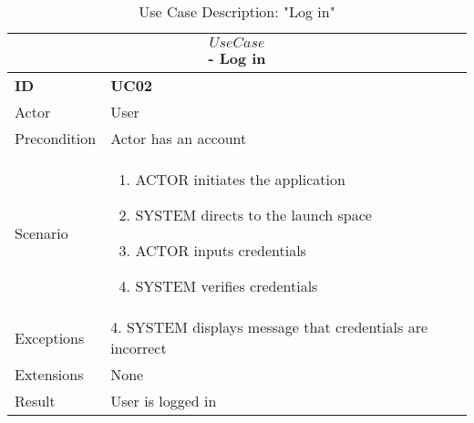 \begin{center}
    \vspace{5mm}
    \begin{table}[H]
        \begin{tabular}{ |p{2cm}||p{11cm}| }
            \hline
            \multicolumn{2}{|c|}{$$Use Case$$ - Log in} \\ \hline
            \textbf{ID} & \textbf{UC02} \\ \hline
            Actor & User \\ \hline
            Precondition & Actor has an account \\ \hline
            Scenario &
            \begin{enumerate}
                \item ACTOR initiates the application
                \item SYSTEM directs to the launch space
                \item ACTOR inputs credentials
                \item SYSTEM verifies credentials
            \end{enumerate}
            \\ \hline 
            Exceptions &  4. SYSTEM displays message that credentials are incorrect\\ \hline
            Extensions & None \\ \hline
            Result & User is logged in \\ \hline
        \end{tabular}
        \caption{Use Case Description: "Log in"}
    \end{table}
    

\end{center}
